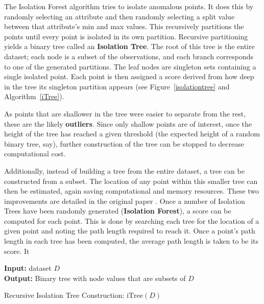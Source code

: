 The Isolation Forest algorithm tries to isolate anomalous points. It does this by randomly selecting an attribute and then randomly selecting a split value between that attribute's min and max values. This recursively partitions the points until every point is isolated in its own partition.
\newl Recursive partitioning yields a binary tree called an \textbf{Isolation Tree}. The root of this tree is the entire dataset; each node is a subset of the observations, and each branch corresponds to one of the generated partitions. The leaf nodes are singleton sets containing a single isolated point. Each point is then assigned a score derived from how deep in the tree its singleton partition appears (see Figure~\ref{isolationtree} and Algorithm~\ref{iTree}). 
\par As points that are shallower in the tree were easier to separate from the rest, these are the likely \textbf{outliers}. Since only shallow points are of interest, once the height of the tree has reached a given threshold (the expected height of a random binary tree, say), further construction of the tree can be stopped to decrease computational cost. \par 
Additionally, instead of building a tree from the entire dataset, a tree can be constructed from a subset. The location of any point within this smaller tree can then be estimated, again saving computational and memory resources. These two improvements are detailed in the original paper \cite{A15}. 
\newl Once a number of Isolation Trees have been randomly generated (\textbf{Isolation Forest}), a score can be computed for each point. This is done by searching each tree for the location of a given point and noting the path length required to reach it. Once a point's path length in each tree has been computed, the average path length is taken to be its score.
\newpage\noindent  It 
\begin{algorithm}[t]
\SetAlgoLined
\textbf{Input:} dataset $D$ %
\\
\textbf{Output:} Binary tree with node values that are subsets of $D$ %
\caption{Recursive Isolation Tree Construction: $\text{iTree}(D)$} %
\label{iTree}
\end{algorithm}
